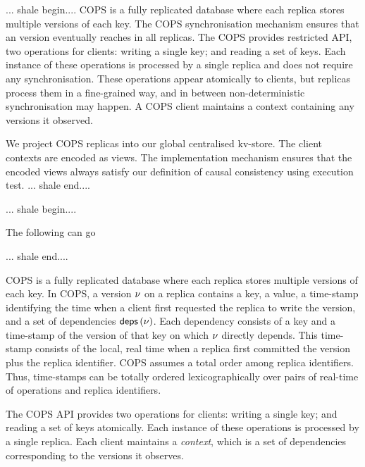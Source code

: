 ... shale begin....
COPS is a fully replicated database where each replica stores multiple versions of each key. 
The COPS synchronisation mechanism ensures that an version eventually reaches in all replicas.
The COPS provides restricted API, two operations for clients: 
writing a single key; and reading a set of keys. 
Each instance of these operations is processed by a single replica and does not require any synchronisation.
These operations appear atomically to clients, but replicas process them in a fine-grained way,
and in between non-deterministic synchronisation may happen.
A COPS client maintains a context containing any versions it observed.

We project COPS replicas into our global centralised kv-store.
The client contexts are encoded as views.
The implementation mechanism ensures that the encoded views always satisfy
our definition of causal consistency using execution test.
... shale end....

... shale begin....

The following can go

... shale end....

COPS is a fully replicated database where  each replica stores multiple versions of each key. 
In COPS, a version \( \nu \) on a replica contains a key, a value, a
time-stamp identifying the time when a client first requested the
replica to write the version, and a set of dependencies
$\depOf[\ver]$.  Each dependency consists of a key and a time-stamp of
the version of that key on which $\nu$ directly depends.  This
 time-stamp consists of the local, real time when a replica
first committed the version plus the replica identifier. COPS assumes
a total order among replica identifiers. Thus,  time-stamps can be
totally ordered lexicographically over pairs of real-time of
operations and replica identifiers.

The COPS API provides two operations for  clients: writing a single
key; and reading 
a set of keys atomically. Each instance of these operations is processed by a single replica. 
Each client maintains a \emph{context}, which is a set of dependencies
corresponding to the versions it observes.  

